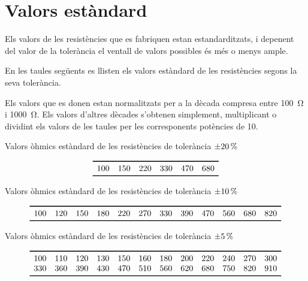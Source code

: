 \section{Valors est\`{a}ndard} 

Els valors de les resist\`{e}ncies que es fabriquen estan estandarditzats, i depenent
del valor de la toler\`{a}ncia el ventall de valors possibles \'{e}s m\'{e}s o menys ample.

En les taules seg\"{u}ents es llisten els valors est\`{a}ndard de les resist\`{e}ncies segons la seva
toler\`{a}ncia.

Els valors que es donen estan normalitzats per a la d\`{e}cada compresa
entre \SI{100}{\ohm} i \SI{1000}{\ohm}. Els valors d'altres d\`{e}cades
s'obtenen simplement, multiplicant o dividint els valors de les
taules per les corresponents  pot\`{e}ncies de 10.

\begin{table}[htb]
   \caption{Valors \`{o}hmics est\`{a}ndard de les resist\`{e}ncies de toler\`{a}ncia $\SI{\pm 20}{\%}$}
   \[ \begin{array}{cccccc}
   \toprule[1pt]
   100 & 150 & 220 & 330 & 470 &  680  \\
   \bottomrule[1pt]
   \end{array}   \]
\end{table}

\begin{table}[htb]
   \caption{Valors \`{o}hmics est\`{a}ndard de les resist\`{e}ncies de toler\`{a}ncia $\SI{\pm 10}{\%}$}
   \[ \begin{array}{cccccccccccc}
   \toprule[1pt]
   100 & 120 & 150 & 180 & 220 & 270 & 330 & 390 & 470 & 560 & 680 & 820 \\
   \bottomrule[1pt]
   \end{array}   \]
\end{table}

\begin{table}[htb]
   \caption{Valors \`{o}hmics est\`{a}ndard de les resist\`{e}ncies de toler\`{a}ncia $\SI{\pm 5}{\%}$}
   \[ \begin{array}{cccccccccccc}
   \toprule[1pt]
   100 & 110 & 120 & 130 & 150 & 160 & 180 & 200 & 220 & 240 & 270 & 300 \\
   330 & 360 & 390 & 430 & 470 & 510 & 560 & 620 & 680 & 750 & 820 & 910 \\
   \bottomrule[1pt]
   \end{array}   \]
\end{table}

